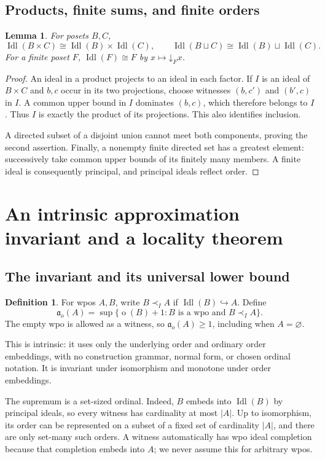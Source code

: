 \documentclass[11pt,letterpaper]{article}
\theoremstyle{teal}
\newtheorem{lemma}[theorem]{Lemma}
\theoremstyle{definition}
\newtheorem{definition}[theorem]{Definition}
\newcommand{\Idl}{\operatorname{Idl}}
\newcommand{\mot}{\operatorname{o}}
\newcommand{\ao}{\mathfrak a_o}
\newcommand{\emb}{\hookrightarrow}
\newcommand{\dn}{\mathord\downarrow}
\begin{document}
\subsection{Products, finite sums, and finite orders}
\begin{lemma}\label{lem:basic-completions}
For posets $B,C$,
\[
 \Idl(B\times C)\cong\Idl(B)\times\Idl(C),\qquad
 \Idl(B\sqcup C)\cong\Idl(B)\sqcup\Idl(C).
\]
For a finite poset $F$, $\Idl(F)\cong F$ by $x\mapsto\dn_Fx$.
\end{lemma}
\begin{proof}
An ideal in a product projects to an ideal in each factor. If $I$ is an ideal of $B\times C$ and $b,c$ occur in its two projections, choose witnesses $(b,c')$ and $(b',c)$ in $I$. A common upper bound in $I$ dominates $(b,c)$, which therefore belongs to $I$. Thus $I$ is exactly the product of its projections. This also identifies inclusion.

A directed subset of a disjoint union cannot meet both components, proving the second assertion. Finally, a nonempty finite directed set has a greatest element: successively take common upper bounds of its finitely many members. A finite ideal is consequently principal, and principal ideals reflect order.
\end{proof}

\section{An intrinsic approximation invariant and a locality theorem}
\subsection{The invariant and its universal lower bound}
\begin{definition}\label{def:ao}
For wpos $A,B$, write $B\prec_I A$ if $\Idl(B)\emb A$. Define
\[
 \ao(A)=\sup\{\mot(B)+1:B\text{ is a wpo and }B\prec_I A\}.
\]
The empty wpo is allowed as a witness, so $\ao(A)\geq1$, including when $A=\varnothing$.
\end{definition}

This is intrinsic: it uses only the underlying order and ordinary order embeddings, with no construction grammar, normal form, or chosen ordinal notation. It is invariant under isomorphism and monotone under order embeddings.

The supremum is a set-sized ordinal. Indeed, $B$ embeds into $\Idl(B)$ by principal ideals, so every witness has cardinality at most $|A|$. Up to isomorphism, its order can be represented on a subset of a fixed set of cardinality $|A|$, and there are only set-many such orders. A witness automatically has wpo ideal completion because that completion embeds into $A$; we never assume this for arbitrary wpos.
\end{document}

